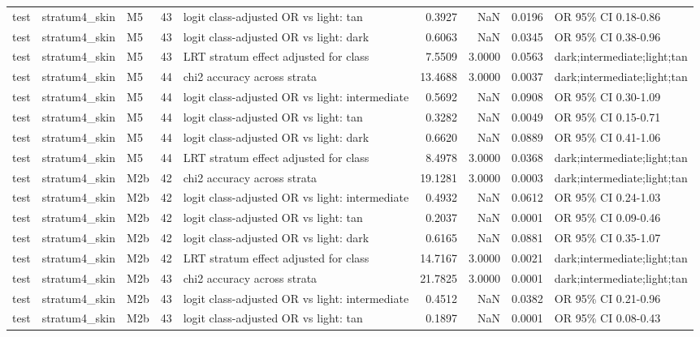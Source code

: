 \begin{tabular}{lllrlrrrl}
test & stratum4\_skin & M5 & 43 & logit class-adjusted OR vs light: tan & 0.3927 & NaN & 0.0196 & OR 95\% CI 0.18-0.86 \\
test & stratum4\_skin & M5 & 43 & logit class-adjusted OR vs light: dark & 0.6063 & NaN & 0.0345 & OR 95\% CI 0.38-0.96 \\
test & stratum4\_skin & M5 & 43 & LRT stratum effect adjusted for class & 7.5509 & 3.0000 & 0.0563 & dark;intermediate;light;tan \\
test & stratum4\_skin & M5 & 44 & chi2 accuracy across strata & 13.4688 & 3.0000 & 0.0037 & dark;intermediate;light;tan \\
test & stratum4\_skin & M5 & 44 & logit class-adjusted OR vs light: intermediate & 0.5692 & NaN & 0.0908 & OR 95\% CI 0.30-1.09 \\
test & stratum4\_skin & M5 & 44 & logit class-adjusted OR vs light: tan & 0.3282 & NaN & 0.0049 & OR 95\% CI 0.15-0.71 \\
test & stratum4\_skin & M5 & 44 & logit class-adjusted OR vs light: dark & 0.6620 & NaN & 0.0889 & OR 95\% CI 0.41-1.06 \\
test & stratum4\_skin & M5 & 44 & LRT stratum effect adjusted for class & 8.4978 & 3.0000 & 0.0368 & dark;intermediate;light;tan \\
test & stratum4\_skin & M2b & 42 & chi2 accuracy across strata & 19.1281 & 3.0000 & 0.0003 & dark;intermediate;light;tan \\
test & stratum4\_skin & M2b & 42 & logit class-adjusted OR vs light: intermediate & 0.4932 & NaN & 0.0612 & OR 95\% CI 0.24-1.03 \\
test & stratum4\_skin & M2b & 42 & logit class-adjusted OR vs light: tan & 0.2037 & NaN & 0.0001 & OR 95\% CI 0.09-0.46 \\
test & stratum4\_skin & M2b & 42 & logit class-adjusted OR vs light: dark & 0.6165 & NaN & 0.0881 & OR 95\% CI 0.35-1.07 \\
test & stratum4\_skin & M2b & 42 & LRT stratum effect adjusted for class & 14.7167 & 3.0000 & 0.0021 & dark;intermediate;light;tan \\
test & stratum4\_skin & M2b & 43 & chi2 accuracy across strata & 21.7825 & 3.0000 & 0.0001 & dark;intermediate;light;tan \\
test & stratum4\_skin & M2b & 43 & logit class-adjusted OR vs light: intermediate & 0.4512 & NaN & 0.0382 & OR 95\% CI 0.21-0.96 \\
test & stratum4\_skin & M2b & 43 & logit class-adjusted OR vs light: tan & 0.1897 & NaN & 0.0001 & OR 95\% CI 0.08-0.43 \\

\end{tabular}
